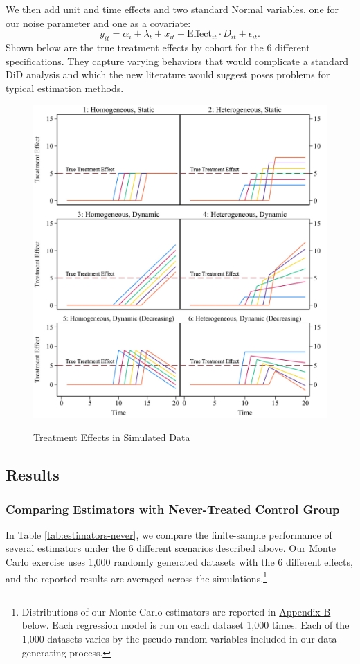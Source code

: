 \documentclass[12pt]{article}
\begin{document}
We then add unit and time effects and two standard Normal variables, one for our noise parameter and one as a covariate:
\begin{equation}
     y_{it} = \alpha_i + \lambda_t + x_{it} + \text{Effect}_{it} \cdot D_{it} + \epsilon_{it}.
\end{equation}
Shown below are the true treatment effects by cohort for the 6 different specifications. They capture varying behaviors that would complicate a standard DiD analysis and which the new literature would suggest poses problems for typical estimation methods.
\begin{figure}[H]
    \centering
    \caption{Treatment Effects in Simulated Data}
    \includegraphics[width=5in]{Figures/Table 1 Treatment Effects Chart.jpg}
    \label{fig:treat-effects}
\end{figure}
\subsection{Results}
\subsubsection{Comparing Estimators with Never-Treated Control Group}
In Table \ref{tab:estimators-never}, we compare the finite-sample performance of several estimators under the 6 different scenarios described above. Our Monte Carlo exercise uses 1,000 randomly generated datasets with the 6 different effects, and the reported results are averaged across the simulations.\footnote{Distributions of our Monte Carlo estimators are reported in \hyperref[sec:appendixb]{Appendix B} below. Each regression model is run on each dataset 1,000 times. Each of the 1,000 datasets varies by the pseudo-random variables included in our data-generating process.}
\end{document}
